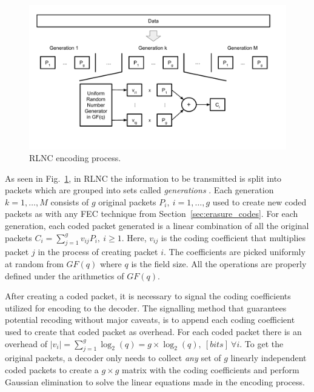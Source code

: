 \begin{figure}[h]
  \centering
  \includegraphics[width=\textwidth]{introduction/figures/RLNC.pdf}
  \caption{RLNC encoding process.}
\label{fig:rlnc_enc}
\end{figure}

As seen in Fig.~\ref{fig:rlnc_enc}, in \ac{RLNC} the information to be transmitted is split into packets which are grouped into sets called \textit{generations} \cite{chou2003practical}. Each generation $k = 1, \ldots, M$ consists of $g$ original packets $P_i,\ i = 1, \ldots, g$ used to create new coded packets as with any \ac{FEC} technique from Section~\ref{sec:erasure_codes}. For each generation, each coded packet generated is a linear combination of all the original packets $C_i = \sum_{j = 1}^g v_{ij} P_i,\ i \geq 1$. Here, $v_{ij}$ is the coding coefficient that multiplies packet $j$ in the process of creating packet $i$. The coefficients are picked uniformly at random from $GF(q)$ where $q$ is the field size. All the operations are properly defined under the arithmetics of $GF(q)$.

After creating a coded packet, it is necessary to signal the coding coefficients utilized for encoding to the decoder. The signalling method that guarantees potential recoding without major caveats, is to append each coding coefficient used to create that coded packet as overhead. For each coded packet there is an overhead of $|v_{i}| = \sum_{j = 1}^g \log_{2}(q) = g \times \log_{2}(q),\ [bits]\ \forall i$. To get the original packets, a decoder only needs to collect \textit{any} set of $g$ linearly independent coded packets to create a $g \times g$ matrix with the coding coefficients and perform Gaussian elimination \cite{fragouli2006network} to solve the linear equations made in the encoding process.

